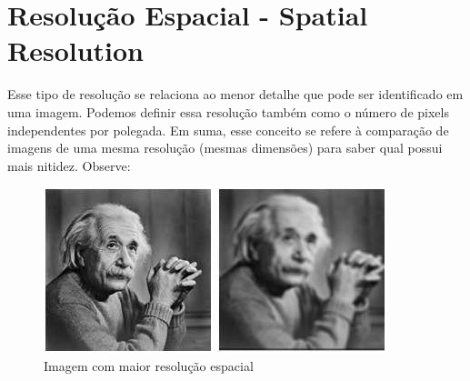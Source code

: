 \documentclass[a4paper, 12pt]{article}
\begin{document}
\section{Resolução Espacial - Spatial Resolution}
Esse tipo de resolução se relaciona ao menor detalhe que pode ser identificado em uma imagem. Podemos definir essa resolução também como 
o número de pixels independentes por polegada. Em suma, esse conceito se refere à comparação de imagens de uma mesma resolução (mesmas 
dimensões) para saber qual possui mais nitidez. Observe:
\begin{figure}[!htb]
	\centering
	  \includegraphics[width=\linewidth]{images/einsteinNitido.jpg}
	  \caption{Imagem com maior resolução espacial}
	\endminipage\hspace{1cm}
	  \includegraphics[width=\linewidth]{images/einstein_spatial.jpg}

\end{figure}
\end{document}

